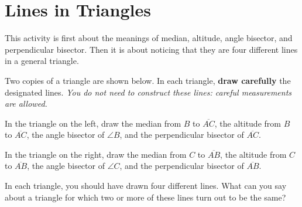 \newpage

\section{Lines in Triangles}

\begin{teachingnote}
This activity is first about the meanings of median, altitude, angle bisector, and perpendicular bisector.  Then it is about noticing that they are four different lines in a general triangle.  
\end{teachingnote}

Two copies of a triangle are shown below.   In each triangle, \textbf{draw carefully} the designated lines.  \emph{You do not need to construct these lines:  careful measurements are allowed.}

\begin{prob}
In the triangle on the left, draw the median from $B$ to $\overline{AC}$, the altitude from $B$ to $\overline{AC}$, the angle bisector of $\angle B$, and the perpendicular bisector of $\overline{AC}$.  

\end{prob}

\begin{prob}
In the triangle on the right, draw the median from $C$ to $\overline{AB}$, the altitude from $C$ to $\overline{AB}$, the angle bisector of $\angle C$, and the perpendicular bisector of $\overline{AB}$. 

%
\end{prob}

\begin{prob}
In each triangle, you should have drawn four different lines.  What can you say about a triangle for which two or more of these lines turn out to be the same?  
\end{prob}

